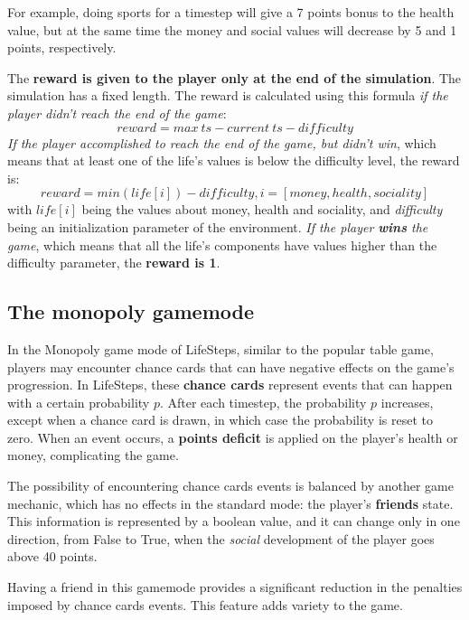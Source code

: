 \documentclass{article}
\begin{document}
For example, doing sports for a timestep will give a 7 points bonus to the health value, but at the same time the money and social values will decrease by 5 and 1 points, respectively.

The \textbf{reward is given to the player only at the end of the simulation}. The simulation has a fixed length. The reward is calculated using this formula \textit{if the player didn't reach the end of the game}:
\begin{displaymath}
    reward = {max\ ts} - {current\ ts} - {difficulty}
\end{displaymath}
\textit{If the player accomplished to reach the end of the game, but didn't win}, which means that at least one of the life's values is below the difficulty level, the reward is:
\begin{displaymath}
    reward = min(life[i]) - difficulty, i=[money, health, sociality]
\end{displaymath}
with \(life[i]\) being the values about money, health and sociality, and \textit{difficulty} being an initialization parameter of the environment. \textit{If the player \textbf{wins} the game}, which means that all the life's components have values higher than the difficulty parameter, the \textbf{reward is 1}.

\subsection{The monopoly gamemode}

In the Monopoly game mode of LifeSteps, similar to the popular table game, players may encounter chance cards that can have negative effects on the game's progression. In LifeSteps, these \textbf{chance cards} represent events that can happen with a certain probability \(p\). After each timestep, the probability \(p\) increases, except when a chance card is drawn, in which case the probability is reset to zero. When an event occurs, a \textbf{points deficit} is applied on the player's health or money, complicating the game. 

The possibility of encountering chance cards events is balanced by another game mechanic, which has no effects in the standard mode: the player's \textbf{friends} state. This information is represented by a boolean value, and it can change only in one direction, from False to True, when the \textit{social} development of the player goes above 40 points. 

Having a friend in this gamemode provides a significant reduction in the penalties imposed by chance cards events. This feature adds variety to the game.
\end{document}

